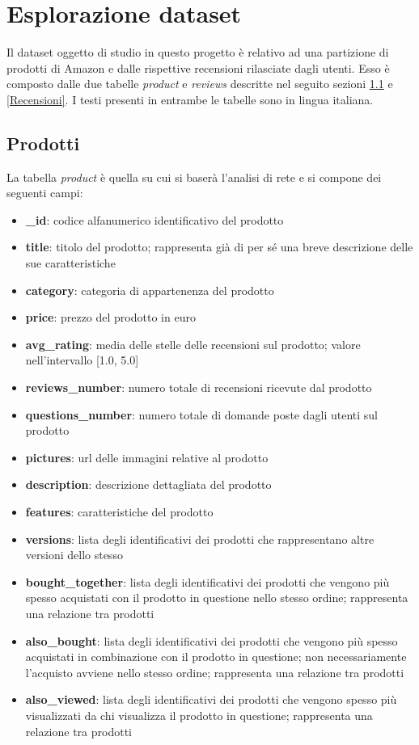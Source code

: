 \section{Esplorazione dataset}\label{EsplorazioneDataset}
Il dataset oggetto di studio in questo progetto è relativo ad una partizione di prodotti di Amazon e dalle rispettive recensioni rilasciate dagli utenti. Esso è composto dalle due tabelle \textit{product} e \textit{reviews} descritte nel seguito sezioni \ref{Prodotti} e \ref{Recensioni}. I testi presenti in entrambe le tabelle sono in lingua italiana.

\subsection{Prodotti}\label{Prodotti}
La tabella \textit{product} è quella su cui si baserà l'analisi di rete e si compone dei seguenti campi:
\begin{itemize}
    \item \textbf{\_id}: codice alfanumerico identificativo del prodotto
    \item \textbf{title}: titolo del prodotto; rappresenta già di per sé una breve descrizione delle sue caratteristiche
    \item \textbf{category}: categoria di appartenenza del prodotto
    \item \textbf{price}: prezzo del prodotto in euro
    \item \textbf{avg\_rating}: media delle stelle delle recensioni sul prodotto; valore nell'intervallo [1.0, 5.0] 
    \item \textbf{reviews\_number}: numero totale di recensioni ricevute dal prodotto
    \item \textbf{questions\_number}: numero totale di domande poste dagli utenti sul prodotto
    \item \textbf{pictures}: url delle immagini relative al prodotto
    \item \textbf{description}: descrizione dettagliata del prodotto
    \item \textbf{features}: caratteristiche del prodotto
    \item \textbf{versions}: lista degli identificativi dei prodotti che rappresentano altre versioni dello stesso
    \item \textbf{bought\_together}: lista degli identificativi dei prodotti che vengono più spesso acquistati con il prodotto in questione nello stesso ordine; rappresenta una relazione tra prodotti
    \item \textbf{also\_bought}: lista degli identificativi dei prodotti che vengono più spesso acquistati in combinazione con il prodotto in questione; non necessariamente l'acquisto avviene nello stesso ordine; rappresenta una relazione tra prodotti
    \item \textbf{also\_viewed}: lista degli identificativi dei prodotti che vengono spesso più visualizzati da chi visualizza il prodotto in questione; rappresenta una relazione tra prodotti
\end{itemize}
